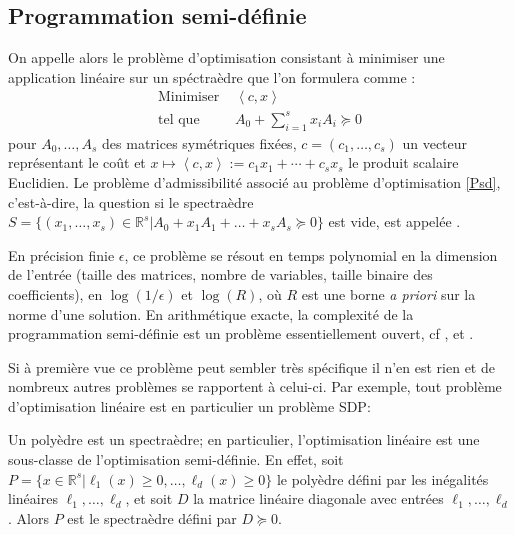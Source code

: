 \subsection{Programmation semi-définie}
\label{subsec:psdreele} 
On appelle alors  le problème d'optimisation
consistant à minimiser une application linéaire sur un spéctraèdre que l'on formulera comme :
\begin{equation}
  \tag{PSD}
\begin{aligned}
  \text{Minimiser } & \left\langle c,x \right\rangle \\
  \text{tel que }   & A_0 + \sum \limits_{i=1}^s x_{i}A_{i} \succeq 0
\end{aligned}
	\label{Psd} 
\end{equation}
pour $A_0,\ldots, A_s$ des matrices symétriques fixées, $c=(c_1,\ldots,c_s)$ un vecteur représentant le coût et $x \mapsto \left\langle c,x \right\rangle := c_1x_1+\cdots+c_sx_s$ le produit scalaire Euclidien. Le problème d'admissibilité associé au problème d'optimisation \eqref{Psd}, c'est-à-dire, la question si le spectraèdre $S = \{(x_1,\ldots,x_s) \in \mathbb{R}^s | A_0+ x_1A_1 + \ldots+ x_s A_s \succeq 0 \}$ est vide, est appelée .

En précision finie $\epsilon$, ce problème se résout en temps polynomial en la dimension de l'entrée (taille des matrices, nombre de variables, taille binaire des coefficients), en $\log(1/\epsilon)$ et $\log(R)$, où $R$ est une borne {\it a priori} sur la norme d'une solution. En arithmétique exacte, la complexité de la programmation semi-définie est un problème essentiellement ouvert, cf \cite[Sec.1.9]{deKlerk}, \cite{ramana1997exact,porkolab1997complexity} et \cite{henrion2016exact}.

Si à première vue ce problème peut sembler très spécifique il n'en est rien et de nombreux autres problèmes se rapportent à celui-ci. Par exemple, tout problème d'optimisation linéaire est en particulier un problème SDP:

\begin{remarque} Un polyèdre est un spectraèdre; en particulier, l'optimisation linéaire est une sous-classe de l'optimisation semi-définie. En effet, soit $P = \{x \in \mathbb{R}^s | \ell_1(x) \geq 0, \ldots, \ell_d(x) \geq 0\}$ le polyèdre défini par les inégalités linéaires $\ell_1,\ldots,\ell_d$, et soit $D$ la matrice linéaire diagonale avec entrées $\ell_1,\ldots,\ell_d$. Alors $P$ est le spectraèdre défini par $D \succeq 0$.
\end{remarque}
